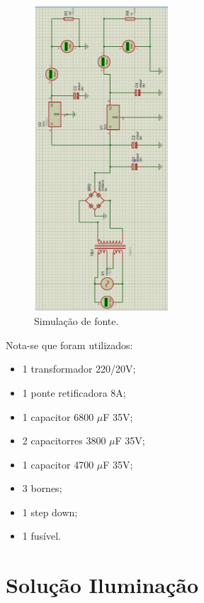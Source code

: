 \begin{figure}[H]
	\centering
	\includegraphics[width=5cm]{figuras/simulacao_fonte.png}
	\caption{Simulação de fonte.}
	\label{simulacao_fonte}
\end{figure}

Nota-se que foram utilizados:

\begin{itemize}
	
	\item 1 transformador 220/20V;
	\item 1 ponte retificadora 8A;
	\item 1 capacitor 6800 $\mu$F 35V; 
	\item 2 capacitorres 3800 $\mu$F 35V;
	\item 1 capacitor 4700 $\mu$F 35V;
	\item 3 bornes;
	\item 1 step down;
	\item 1 fusível.
	
\end{itemize}

\section{Solução Iluminação}

